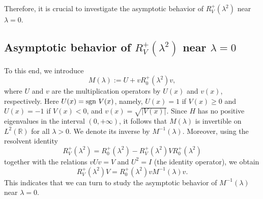 \documentclass[reqno]{amsart}
\newcommand\R{\mathbb{R}}
\numberwithin{equation}{section}
\begin{document}
 Therefore, it is crucial to investigate the asymptotic behavior of $R^+_V(\lambda^2)$ near $\lambda=0$.
\subsection{Asymptotic behavior of $R^+_V(\lambda^2)$ near $\lambda=0$}\label{sec of asy of RV}
To this end, we introduce 
$$M(\lambda):=U+vR^{+}_{0}(\lambda^{2})v,$$
where $U$ and $v$ are the multiplication operators by $U(x)$ and $v(x)$, respectively. Here $U(x)={\rm sgn}~V(x)$, namely, $U(x)=1$ if $V(x)\geq0$ and $U(x)=-1$ if $V(x)<0$, and $v(x)=\sqrt {|V(x)|}$. Since $H$ has no positive eigenvalues in the interval $(0,+\infty)$, it follows that $M(\lambda)$ is invertible on $L^2(\R)$ for all $\lambda>0$. We denote its inverse by $M^{-1}(\lambda)$.
Moreover, using the resolvent identity
$$R^+_V(\lambda^2)=R_0^{+}(\lambda^2)-R^{+}_V(\lambda^2)VR^+_0(\lambda^2)$$
together with the relations $vUv=V$ and $U^2=I$ (the identity operator), we obtain
\begin{equation}\label{relat between RV and M}
R^{+}_{V}(\lambda^{2})V=R^{+}_{0}(\lambda^{2})vM^{-1}(\lambda)v.
\end{equation}
This indicates that we can turn to study the asymptotic behavior of $M^{-1}(\lambda)$ near $\lambda=0$. 
\end{document}
